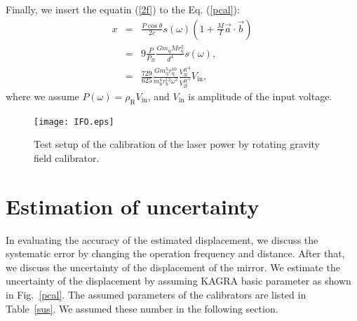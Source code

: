 \documentclass[A4]{spie}  %
\begin{document}
Finally, we insert the equatin (\ref{2f}) to the Eq. (\ref{pcal}):
\begin{eqnarray}
x&=&\frac{P \cos{\theta}}{2c} s(\omega)\left(1+\frac{M}{I}\vec{a} \cdot \vec{b} \right) \\
 &=&9\frac{P}{P_{\mathrm{2f}}}\frac{Gm_{\mathrm{q}} M r_{\mathrm{q}}^2}{d^4}s(\omega) , \\
 &=&\frac{729}{625} \frac{G m^5_{\mathrm{q}} r_{\mathrm{q}}^{10}}{m^4_{\mathrm{h}} r_{\mathrm{h}}^{12} \omega^2} \frac{{V_{\mathrm{3f}}^{R}}^4}{{V_{\mathrm{2f}}^{R}}^5}V_{\mathrm{in}} , \label{pcal_new}
\end{eqnarray}
where we assume $P(\omega)=\rho_{\mathrm{R}} V_{\mathrm{in}}$, and $V_{\mathrm{in}}$ is amplitude of the input voltage.
\begin{figure}
\begin{center}
\texttt{[image: IFO.eps]}
\caption{Test setup of the calibration of the laser power by rotating gravity field calibrator.}
\label{fig:IFO}
\end{center}
\end{figure}

\section{Estimation of uncertainty} \label{sec:EST}
In evaluating the accuracy of the estimated displacement, we discuss the systematic error by changing the operation frequency and distance. After that, we discuss the uncertainty of the displacement of the mirror. 
We estimate the uncertainty of the displacement by assuming KAGRA basic parameter as shown in Fig.~\ref{pcal}. The assumed parameters of the calibrators are listed in Table~\ref{sus}. We assumed these number in the following section.
\end{document}
